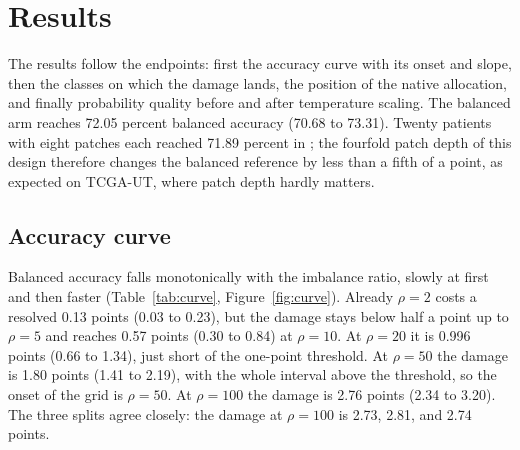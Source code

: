 \section{Results}
\label{sec:results}
The results follow the endpoints: first the accuracy curve with its onset and slope, then the classes on which the damage lands, the position of the native allocation, and finally probability quality before and after temperature scaling. The balanced arm reaches 72.05 percent balanced accuracy (70.68 to 73.31). Twenty patients with eight patches each reached 71.89 percent in \citet{queisler2026centreError}; the fourfold patch depth of this design therefore changes the balanced reference by less than a fifth of a point, as expected on TCGA-UT, where patch depth hardly matters.

\subsection{Accuracy curve}
\label{sec:curve-results}
Balanced accuracy falls monotonically with the imbalance ratio, slowly at first and then faster (Table~\ref{tab:curve}, Figure~\ref{fig:curve}). Already $\rho=2$ costs a resolved 0.13 points (0.03 to 0.23), but the damage stays below half a point up to $\rho=5$ and reaches 0.57 points (0.30 to 0.84) at $\rho=10$. At $\rho=20$ it is 0.996 points (0.66 to 1.34), just short of the one-point threshold. At $\rho=50$ the damage is 1.80 points (1.41 to 2.19), with the whole interval above the threshold, so the onset of the grid is $\rho=50$. At $\rho=100$ the damage is 2.76 points (2.34 to 3.20). The three splits agree closely: the damage at $\rho=100$ is 2.73, 2.81, and 2.74 points.

